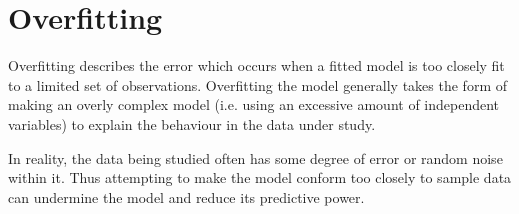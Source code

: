 \documentclass[MASTER.tex]{subfiles}
\begin{document}
\section{Overfitting} 
Overfitting describes the error which occurs when a fitted model is too 
closely fit to a limited set of observations. Overfitting the model generally 
takes the form of making an overly complex model (i.e. using an 
excessive amount of independent variables) to explain the behaviour in 
the data under study. 
 
In reality, the data being studied often has some degree of error or 
random noise within it. Thus attempting to make the model conform too 
closely to sample data can undermine the model and reduce its predictive 
power. 
 
 
\end{document}
